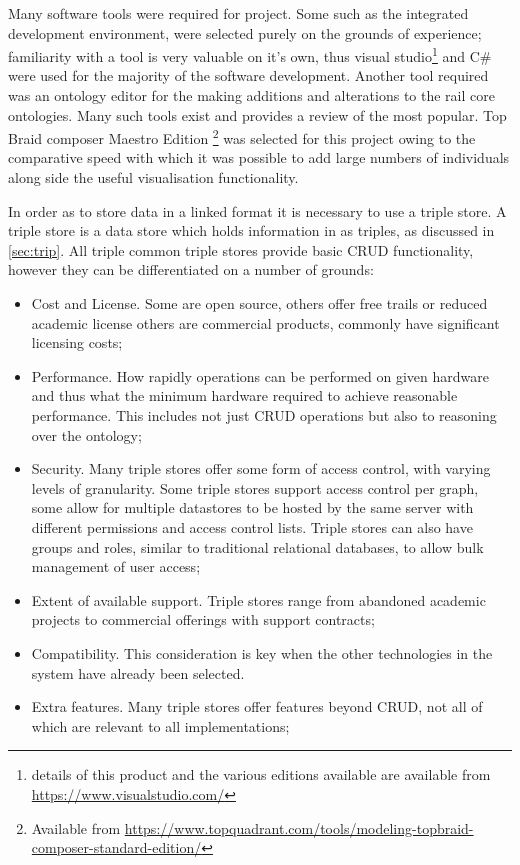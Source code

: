 Many software tools were required for project. Some such as the integrated development environment, were selected purely on the grounds of experience; familiarity with a tool is very valuable on it's own, thus visual studio\footnote{details of this product and the various editions available are available from \url{https://www.visualstudio.com/}} and C\# were used for the majority of the software development. Another tool required was an ontology editor for the making additions and alterations to the rail core ontologies. Many such tools exist and \citet{Erlingsson2016} provides a review of the most popular. Top Braid composer Maestro Edition \footnote{Available from \url{https://www.topquadrant.com/tools/modeling-topbraid-composer-standard-edition/}} was selected for this project owing to the comparative speed with which it was possible to add large numbers of individuals along side the useful visualisation functionality. 

In order as to store data in a linked format it is necessary to use a triple store. A triple store is a data store which holds information in as triples, as discussed in \autoref{sec:trip}. All triple common triple stores provide basic CRUD functionality, however they can be differentiated on a number of grounds: 

\begin{itemize}    
    \item Cost and License. Some are open source, others offer free trails or reduced academic license others are commercial products, commonly have significant licensing costs;
    \item Performance. How rapidly operations can be performed on given hardware and thus what the minimum hardware required to achieve reasonable performance. This includes not just CRUD operations but also to reasoning over the ontology;
    \item Security. Many triple stores offer some form of access control, with varying levels of granularity. Some triple stores support access control per graph, some allow for multiple datastores to be hosted by the same server with different permissions and access control lists. Triple stores can also have groups and roles, similar to traditional relational databases, to allow bulk management of user access;
    \item Extent of available support. Triple stores range from abandoned academic projects to commercial offerings with support contracts;
    \item Compatibility. This consideration is key when the other technologies in the system have already been selected.
    \item Extra features. Many triple stores offer features beyond CRUD, not all of which are relevant to all implementations;
\end{itemize}

